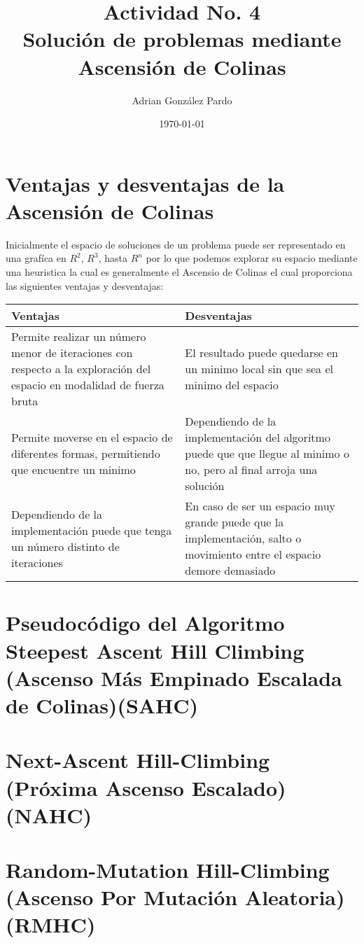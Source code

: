 \documentclass[10pt]{article}
\title{Actividad No. 4\\ Solución de problemas mediante Ascensión de Colinas}
\author{Adrian González Pardo}
\date{\today}
\begin{document}
\maketitle
\section{Ventajas y desventajas de la Ascensión de Colinas}
Inicialmente el espacio de soluciones de un problema puede ser representado en una grafíca en $R^{2}$, $R^{3}$, hasta $R^{n}$ por lo que podemos explorar su espacio mediante una heuristica la cual es generalmente el Ascensio de Colinas el cual proporciona las siguientes ventajas y desventajas:
\begin{center}
  \begin{tabular}{| p{6cm} | p{6cm} | }
    \hline
    Ventajas & Desventajas
    \\\hline
    Permite realizar un número menor de iteraciones con respecto a la exploración del espacio en modalidad de fuerza bruta & El resultado puede quedarse en un minimo local sin que sea el minimo del espacio\\
    \hline
    Permite moverse en el espacio de diferentes formas, permitiendo que encuentre un minimo & Dependiendo de la implementación del algoritmo puede que que llegue al minimo o no, pero al final arroja una solución\\\hline
    Dependiendo de la implementación puede que tenga un número distinto de iteraciones & En caso de ser un espacio muy grande puede que la implementación, salto o movimiento entre el espacio demore demasiado\\\hline
  \end{tabular}
\end{center}
\section{Pseudocódigo del Algoritmo Steepest Ascent Hill Climbing (Ascenso Más Empinado Escalada de Colinas)(SAHC)}

\section{Next-Ascent Hill-Climbing (Próxima Ascenso Escalado)(NAHC)}

\section{Random-Mutation Hill-Climbing (Ascenso Por Mutación Aleatoria)(RMHC)}

\end{document}
